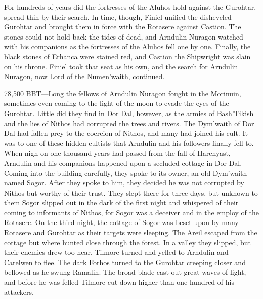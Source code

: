 \documentclass[smalldemyvopaper,11pt,twoside,onecolumn,openright,extrafontsizes]{memoir}
\begin{document}
{{	For hundreds of years did the fortresses of the Aluhos hold against the Gurohtar, spread thin by their search. In time, though, Finiel unified the disheveled Gurohtar and brought them in force with the Rotasere against Castion. The stones could not hold back the tides of dead, and Arndulin Nuragon watched with his companions as the fortresses of the Aluhos fell one by one. Finally, the black stones of Erhanca were stained red, and Castion the Shipwright was slain on his throne. Finiel took that seat as his own, and the search for Arndulin Nuragon, now Lord of the Numen’waith, continued.

78,500 BBT—Long the fellows of Arndulin Nuragon fought in the Morinuin, sometimes even coming to the light of the moon to evade the eyes of the Gurohtar. Little did they find in Dor Dal, however, as the armies of Bash’Tikish and the lies of Nithos had corrupted the trees and rivers. The Dym’waith of Dor Dal had fallen prey to the coercion of Nithos, and many had joined his cult. It was to one of these hidden cultists that Arndulin and his followers finally fell to.
	When nigh on one thousand years had passed from the fall of Harenyast, Arndulin and his companions happened upon a secluded cottage in Dor Dal. Coming into the building carefully, they spoke to its owner, an old Dym’waith named Sogor. After they spoke to him, they decided he was not corrupted by Nithos but worthy of their trust. They slept there for three days, but unknown to them Sogor slipped out in the dark of the first night and whispered of their coming to informants of Nithos, for Sogor was a deceiver and in the employ of the Rotasere. On the third night, the cottage of Sogor was beset upon by many Rotasere and Gurohtar as their targets were sleeping. The Areil escaped from the cottage but where hunted close through the forest. In a valley they slipped, but their enemies drew too near. Tilmore turned and yelled to Arndulin and Carelwen to flee. The dark Forhos turned to the Gurohtar creeping closer and bellowed as he swung Ramalin. The broad blade cast out great waves of light, and before he was felled Tilmore cut down higher than one hundred of his attackers.
}}
\end{document}
